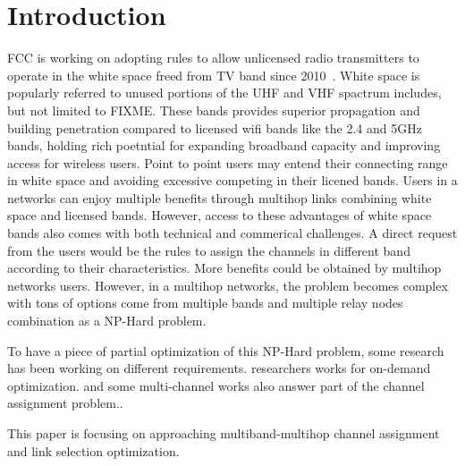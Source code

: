 
\section{Introduction}
\label{sec:introduction}

FCC is working on adopting rules to allow unlicensed radio transmitters to operate in the white space freed from TV band since 2010~\cite{fccwhitespace}. White space is popularly referred to unused portions of the UHF and VHF spactrum includes, but not limited to {FIXME}. These bands provides superior propagation and building penetration compared to licensed wifi bands like the 2.4 and 5GHz bands, holding rich poetntial for expanding broadband capacity and improving access for wireless users. 
Point to point users may entend their connecting range in white space and avoiding excessive competing in their licened bands.
Users in a networks can enjoy multiple benefits through multihop links combining white space and licensed bands. However, access to these advantages of white space bands also comes with both technical and commerical challenges. A direct request from the users would be the rules to assign the channels in different band according to their characteristics. 
More benefits could be obtained by multihop networks users. However, in a multihop networks, the problem becomes complex with tons of options come from multiple bands and multiple relay nodes combination as a NP-Hard problem.


To have a piece of partial optimization of this NP-Hard problem, some research has been working on different requirements. researchers works for on-demand optimization. and some multi-channel works also answer part of the channel assignment problem..


This paper is focusing on approaching multiband-multihop channel assignment and link selection optimization.

